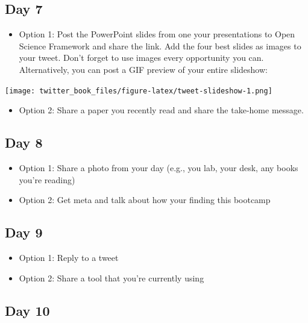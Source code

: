 \documentclass[
]{book}
\providecommand{\tightlist}{%
  \setlength{\itemsep}{0pt}\setlength{\parskip}{0pt}}
\begin{document}
\hypertarget{day-7}{%
\subsection*{Day 7}\label{day-7}}

\begin{itemize}
\tightlist
\item
  Option 1: Post the PowerPoint slides from one your presentations to Open Science Framework and share the link. Add the four best slides as images to your tweet. Don't forget to use images every opportunity you can. Alternatively, you can post a GIF preview of your entire slideshow:
\end{itemize}

\texttt{[image: twitter\_book\_files/figure-latex/tweet-slideshow-1.png]}

\begin{itemize}
\tightlist
\item
  Option 2: Share a paper you recently read and share the take-home message.
\end{itemize}

\hypertarget{day-8}{%
\subsection*{Day 8}\label{day-8}}

\begin{itemize}
\tightlist
\item
  Option 1: Share a photo from your day (e.g., you lab, your desk, any books you're reading)
\item
  Option 2: Get meta and talk about how your finding this bootcamp
\end{itemize}

\hypertarget{day-9}{%
\subsection*{Day 9}\label{day-9}}

\begin{itemize}
\tightlist
\item
  Option 1: Reply to a tweet
\item
  Option 2: Share a tool that you're currently using
\end{itemize}

\hypertarget{day-10}{%
\subsection*{Day 10}\label{day-10}}
\end{document}
